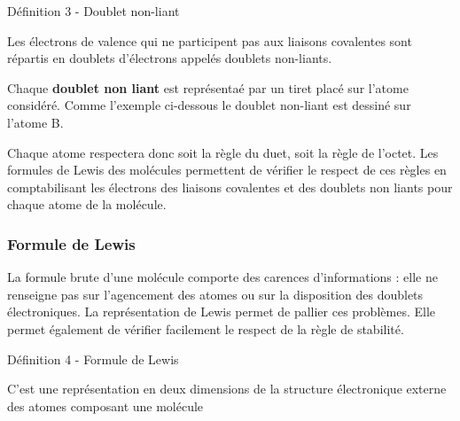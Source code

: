 \documentclass[french, a4paper, 12pt]{article}
\begin{document}
\begin{definition}{Définition 3 - Doublet non-liant}
	\medskip 

	Les électrons de valence qui ne participent pas aux liaisons covalentes sont répartis en doublets d'électrons appelés doublets non-liants. 
\end{definition}

Chaque \textbf{doublet non liant} est représentaé par un tiret placé sur l'atome considéré. Comme l'exemple ci-dessous le doublet non-liant est dessiné sur l'atome B.
\begin{center}
\end{center}

Chaque atome respectera donc soit la règle du duet, soit la règle de l'octet. Les formules de Lewis des molécules permettent de vérifier le respect de ces règles en comptabilisant les électrons des liaisons covalentes et des doublets non liants pour chaque atome de la molécule.




\subsubsection{Formule de Lewis}

La formule brute d'une molécule comporte des carences d'informations : elle
ne renseigne pas sur l’agencement des atomes ou sur la disposition des doublets
électroniques. La représentation de Lewis permet de pallier ces problèmes. Elle
permet également de vérifier facilement le respect de la règle de stabilité.

\begin{definition}{Définition 4 - Formule de Lewis}

C'est une représentation en deux dimensions de la structure électronique externe des atomes composant une molécule

\end{definition}
\end{document}
